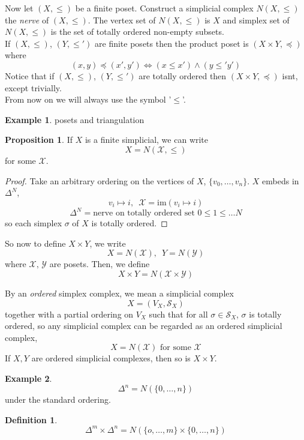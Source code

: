 \documentclass[a4paper,14pt]{extarticle}
\theoremstyle{definition}
\newtheorem*{definition}{Definition}
\newtheorem*{proposition}{Proposition}
\newtheorem*{eg}{Example}
\begin{document}
Now let $(X,\leq)$ be a finite poset. Construct a simplicial complex $N(X,\leq)$ the 
\emph{nerve}
 of $(X,\leq)$. The vertex set of $N(X,\leq)$ is $X$ and simplex set of $N(X,\leq)$ is 
 the set of totally ordered non-empty subsets. \\

 If $(X,\leq)$, $(Y,\leq')$ are finite posets then the product poset is 
 $(X\times Y,\preccurlyeq)$ where 
 \[(x,y)\preccurlyeq(x',y')\iff (x\leq x')\wedge(y\leq' y')\] Notice that if 
 $(X,\leq)$, $(Y,\leq')$ are totally ordered then $(X\times Y,\preccurlyeq)$ isnt, 
 except trivially. \\

 From now on we will always use the symbol '$\leq$'.

\begin{eg}
	posets and triangulation
\end{eg}

\begin{proposition}
	If $X$ is a finite simplicial, we can write \[X=N(\mathcal{X},\leq)\] for some $\mathcal{X}$.
\end{proposition}

\begin{proof}
	Take an arbitrary ordering on the vertices of $X$, $\{v_0,\ldots,v_n\}$. $X$ embeds
	in $\Delta^N$, \[v_i\mapsto i,\,\,\,\mathcal{X}=\text{im}(v_i\mapsto i)\]
	\[\Delta^N=\text{nerve on totally ordered set }0\leq1\leq\ldots N\] so each simplex 
	$\sigma$ of $X$ is totally ordered.
\end{proof}

\noindent So now to define $X\times Y$, we write
\[X=N(\mathcal{X}), \,\,\,Y=N(\mathcal{Y})\] where $\mathcal{X}, \,\mathcal{Y}$ are posets.
Then, we define \[X\times Y=N(\mathcal{X}\times\mathcal{Y})\]

\noindent By an \emph{ordered} simplex complex, we mean a simplicial complex 
\[X=(V_X, \mathcal{S}_X)\] together with a partial ordering on $V_X$ such that for all 
$\sigma\in\mathcal{S}_X$, $\sigma$ is totally ordered, so any simplicial complex can be
regarded as an ordered simplicial complex,
\[X=N(\mathcal{X})\text{ for some }\mathcal{X}\]
If $X,Y$ are ordered simplicial complexes, then so is $X\times Y$.

\begin{eg}
	\[\Delta^n=N(\{0,\ldots,n\})\] under the standard ordering.
\end{eg}

\begin{definition}
	\[\Delta^m\times\Delta^n=N(\{o,\ldots,m\}\times\{0,\ldots,n\})\]
\end{definition}
\end{document}
